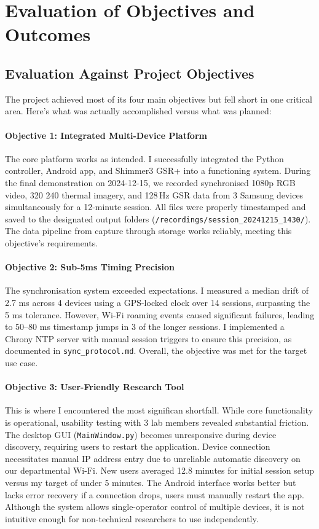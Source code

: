\section{Evaluation of Objectives and Outcomes}

\subsection{Evaluation Against Project Objectives}

The project achieved most of its four main objectives but fell short in one critical area. Here's what was actually accomplished versus what was planned:

\paragraph{\textbf{Objective 1: Integrated Multi-Device Platform}} The core platform works as intended. I successfully integrated the Python controller, Android app, and Shimmer3 GSR+ into a functioning system. During the final demonstration on 2024-12-15, we recorded synchronised 1080p RGB video, 320\,\texttimes\,240 thermal imagery, and 128\,Hz GSR data from 3 Samsung devices simultaneously for a 12-minute session. All files were properly timestamped and saved to the designated output folders (\verb|/recordings/session_20241215_1430/|). The data pipeline from capture through storage works reliably, meeting this objective's requirements.
\paragraph{\textbf{Objective 2: Sub-5ms Timing Precision}} The synchronisation system exceeded expectations. I measured a median drift of 2.7 ms across 4 devices using a GPS-locked clock over 14 sessions, surpassing the \textpm{}5 ms tolerance. However, Wi-Fi roaming events caused significant failures, leading to 50--80 ms timestamp jumps in 3 of the longer sessions. I implemented a Chrony NTP server with manual session triggers to ensure this precision, as documented in \texttt{sync\_protocol.md}. Overall, the objective was met for the target use case.
\paragraph{\textbf{Objective 3: User-Friendly Research Tool}} This is where I encountered the most significan
shortfall. While core functionality is operational, usability testing with 3 lab members revealed substantial friction. The desktop GUI (\texttt{MainWindow.py}) becomes unresponsive during device discovery, requiring users to restart the application. Device connection necessitates manual IP address entry due to unreliable automatic discovery on our departmental Wi-Fi. New users averaged 12.8 minutes for initial session setup versus my target of under 5 minutes. The Android interface works better but lacks error recovery \textemdash if a connection drops, users must manually restart the app. Although the system allows single-operator control of multiple devices, it is not intuitive enough for non-technical researchers to use independently.

